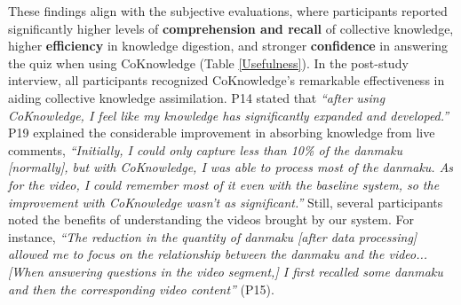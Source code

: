 These findings align with the subjective evaluations, where participants reported significantly higher levels of \textbf{comprehension and recall} of collective knowledge, higher \textbf{efficiency} in knowledge digestion, and stronger \textbf{confidence} in answering the quiz when using CoKnowledge (Table \ref{Usefulness}).
In the post-study interview, all participants recognized CoKnowledge's remarkable effectiveness in aiding collective knowledge assimilation.
P14 stated that \textit{``after using CoKnowledge, I feel like my knowledge has significantly expanded and developed.''} 
P19 explained the considerable improvement in absorbing knowledge from live comments, \textit{``Initially, I could only capture less than 10\% of the danmaku [normally], but with CoKnowledge, I was able to process most of the danmaku. As for the video, I could remember most of it even with the baseline system, so the improvement with CoKnowledge wasn’t as significant.''}
Still, several participants noted the benefits of understanding the videos brought by our system. For instance, \textit{“The reduction in the quantity of danmaku [after data processing] allowed me to focus on the relationship between the danmaku and the video... [When answering questions in the video segment,] I first recalled some danmaku and then the corresponding video content''} (P15). 


